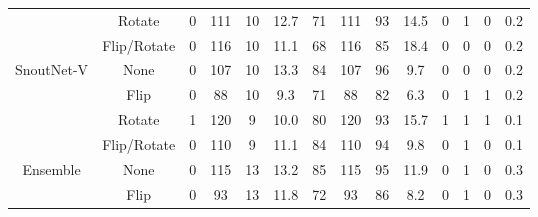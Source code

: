 \documentclass[letterpaper,11pt]{article}
\begin{document}
\begin{table}[h!]
{\begin{tabular}{|c|c|c|c|c|c|c|c|c|c|c|c|c|c|}
      \cline{2-14}
                                  & Rotate                        & 0                                        & 111                                                & 10                                                & 12.7  & 71  & 111 & 93   & 14.5  & 0   & 1   & 0    & 0.2   \\
      \cline{2-14}
                                  & Flip/Rotate                   & 0                                        & 116                                                & 10                                                & 11.1  & 68  & 116 & 85   & 18.4  & 0   & 0   & 0    & 0.2   \\
      \hline
      \multirow{4}{*}{SnoutNet-V} & None                          & 0                                        & 107                                                & 10                                                & 13.3  & 84  & 107 & 96   & 9.7   & 0   & 0   & 0    & 0.2   \\
      \cline{2-14}
                                  & Flip                          & 0                                        & 88                                                 & 10                                                & 9.3   & 71  & 88  & 82   & 6.3   & 0   & 1   & 1    & 0.2   \\
      \cline{2-14}
                                  & Rotate                        & 1                                        & 120                                                & 9                                                 & 10.0  & 80  & 120 & 93   & 15.7  & 1   & 1   & 1    & 0.1   \\
      \cline{2-14}
                                  & Flip/Rotate                   & 0                                        & 110                                                & 9                                                 & 11.1  & 84  & 110 & 94   & 9.8   & 0   & 1   & 0    & 0.1   \\
      \hline
      \multirow{4}{*}{Ensemble}   & None                          & 0                                        & 115                                                & 13                                                & 13.2  & 85  & 115 & 95   & 11.9  & 0   & 1   & 0    & 0.3   \\
      \cline{2-14}
                                  & Flip                          & 0                                        & 93                                                 & 13                                                & 11.8  & 72  & 93  & 86   & 8.2   & 0   & 1   & 0    & 0.3   \\

\end{tabular}}
\end{table}
\end{document}
